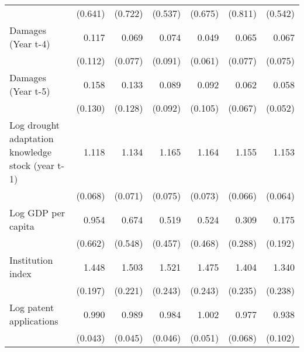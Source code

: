\begin{table}[htbp]
\begin{tabular}{l*{6}{D{.}{.}{-1}}}
                    &     (0.641)         &     (0.722)         &     (0.537)         &     (0.675)         &     (0.811)         &     (0.542)         \\
\addlinespace
Damages (Year t-4)  &       0.117\sym{**} &       0.069\sym{**} &       0.074\sym{**} &       0.049\sym{**} &       0.065\sym{**} &       0.067\sym{**} \\
                    &     (0.112)         &     (0.077)         &     (0.091)         &     (0.061)         &     (0.077)         &     (0.075)         \\
\addlinespace
Damages (Year t-5)  &       0.158\sym{**} &       0.133\sym{**} &       0.089\sym{**} &       0.092\sym{**} &       0.062\sym{**} &       0.058\sym{***}\\
                    &     (0.130)         &     (0.128)         &     (0.092)         &     (0.105)         &     (0.067)         &     (0.052)         \\
\addlinespace
Log drought adaptation knowledge stock (year t-1)&       1.118\sym{*}  &       1.134\sym{**} &       1.165\sym{**} &       1.164\sym{**} &       1.155\sym{**} &       1.153\sym{**} \\
                    &     (0.068)         &     (0.071)         &     (0.075)         &     (0.073)         &     (0.066)         &     (0.064)         \\
\addlinespace
Log GDP per capita  &       0.954         &       0.674         &       0.519         &       0.524         &       0.309         &       0.175         \\
                    &     (0.662)         &     (0.548)         &     (0.457)         &     (0.468)         &     (0.288)         &     (0.192)         \\
\addlinespace
Institution index   &       1.448\sym{***}&       1.503\sym{***}&       1.521\sym{***}&       1.475\sym{**} &       1.404\sym{**} &       1.340\sym{*}  \\
                    &     (0.197)         &     (0.221)         &     (0.243)         &     (0.243)         &     (0.235)         &     (0.238)         \\
\addlinespace
Log patent applications&       0.990         &       0.989         &       0.984         &       1.002         &       0.977         &       0.938         \\
                    &     (0.043)         &     (0.045)         &     (0.046)         &     (0.051)         &     (0.068)         &     (0.102)         \\

\end{tabular}
\end{table}

